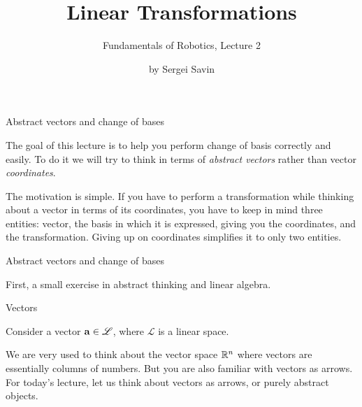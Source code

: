 \documentclass{beamer}
\title{Linear Transformations}
\subtitle{Fundamentals of Robotics, Lecture 2}
\author{by Sergei Savin}
\date{\mydate}
\begin{document}
\maketitle


%
%


\begin{frame}{Abstract vectors and change of bases}
	\begin{flushleft}
		
		The goal of this lecture is to help you perform change of basis correctly and easily. To do it we will try to think in terms of \emph{abstract vectors} rather than vector \emph{coordinates}. 
		
		
		\bigskip
		
		The motivation is simple. If you have to perform a transformation while thinking about a vector in terms of its coordinates, you have to keep in mind three entities: vector, the basis in which it is expressed, giving you the coordinates, and the transformation. Giving up on coordinates simplifies it to only two entities.
		
		
	\end{flushleft}
\end{frame}

\begin{frame}{Abstract vectors and change of bases}
	\begin{flushleft}
		
		First, a small exercise in abstract thinking and linear algebra.
		
	\end{flushleft}
\end{frame}


\begin{frame}{Vectors}
	\begin{flushleft}
		
		Consider a vector $\mathbf{a} \in \mathscr{L}$, where $\mathscr{L}$ is a linear space. 
		
		
		\bigskip
		
		We are very used to think about the vector space $\mathbb{R}^n$ where vectors are essentially columns of numbers. But you are also familiar with vectors as arrows. For today's lecture, let us think about vectors as arrows, or purely abstract objects.
		
		
	\end{flushleft}
\end{frame}
\end{document}
